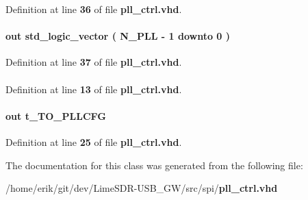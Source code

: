 Definition at line {\bf 36} of file {\bf pll\+\_\+ctrl.\+vhd}.

\paragraph[{pllrst\+\_\+start}]{ {\bfseries \textcolor{keywordflow}{out}\textcolor{vhdlchar}{ }} {\bfseries \textcolor{comment}{std\+\_\+logic\+\_\+vector}\textcolor{vhdlchar}{ }\textcolor{vhdlchar}{(}\textcolor{vhdlchar}{ }\textcolor{vhdlchar}{ }\textcolor{vhdlchar}{ }\textcolor{vhdlchar}{ }{\bfseries {\bf N\+\_\+\+P\+LL}} \textcolor{vhdlchar}{-\/}\textcolor{vhdlchar}{ } \textcolor{vhdldigit}{1} \textcolor{vhdlchar}{ }\textcolor{keywordflow}{downto}\textcolor{vhdlchar}{ }\textcolor{vhdlchar}{ } \textcolor{vhdldigit}{0} \textcolor{vhdlchar}{ }\textcolor{vhdlchar}{)}\textcolor{vhdlchar}{ }} \hspace{0.3cm}{\ttfamily [Port]}}\label{classpll__ctrl_a0e41ea0c3ae555d1309baf62f344448b}


Definition at line {\bf 37} of file {\bf pll\+\_\+ctrl.\+vhd}.

\paragraph[{std\+\_\+logic\+\_\+1164}]{\hspace{0.3cm}{\ttfamily [Package]}}\label{classpll__ctrl_acd03516902501cd1c7296a98e22c6fcb}


Definition at line {\bf 13} of file {\bf pll\+\_\+ctrl.\+vhd}.

\paragraph[{to\+\_\+pllcfg}]{ {\bfseries \textcolor{keywordflow}{out}\textcolor{vhdlchar}{ }} {\bfseries {\bfseries {\bf t\+\_\+\+T\+O\+\_\+\+P\+L\+L\+C\+FG}} \textcolor{vhdlchar}{ }} \hspace{0.3cm}{\ttfamily [Port]}}\label{classpll__ctrl_a5f98029acb201482f838a56670d3030c}


Definition at line {\bf 25} of file {\bf pll\+\_\+ctrl.\+vhd}.



The documentation for this class was generated from the following file\+:\begin{DoxyCompactItemize}
\item 
/home/erik/git/dev/\+Lime\+S\+D\+R-\/\+U\+S\+B\+\_\+\+G\+W/src/spi/{\bf pll\+\_\+ctrl.\+vhd}\end{DoxyCompactItemize}
